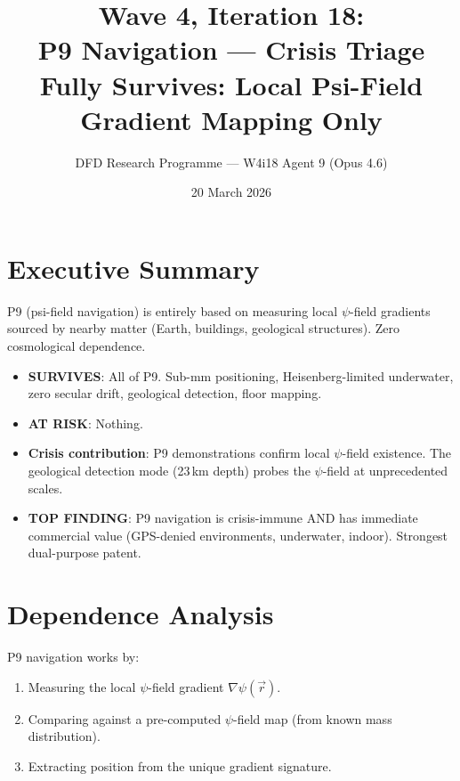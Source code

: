 \documentclass[11pt]{article}
\title{\textbf{Wave 4, Iteration 18:}\\
\textbf{P9 Navigation --- Crisis Triage}\\[6pt]
{\large Fully Survives: Local Psi-Field Gradient Mapping Only}}
\author{DFD Research Programme --- W4i18 Agent 9 (Opus 4.6)}
\date{20 March 2026}
\begin{document}
\maketitle

\section*{Executive Summary}

\begin{tcolorbox}[colback=green!5!white, colframe=green!70!black,
  title=\textbf{W4i18: P9 FULLY SURVIVES}]

P9 (psi-field navigation) is entirely based on measuring local
$\psi$-field gradients sourced by nearby matter (Earth, buildings,
geological structures). Zero cosmological dependence.

\begin{itemize}
\item \textbf{SURVIVES}: All of P9. Sub-mm positioning, Heisenberg-limited
  underwater, zero secular drift, geological detection, floor mapping.
\item \textbf{AT RISK}: Nothing.
\item \textbf{Crisis contribution}: P9 demonstrations confirm local
  $\psi$-field existence. The geological detection mode (23\,km depth)
  probes the $\psi$-field at unprecedented scales.
\item \textbf{TOP FINDING}: P9 navigation is crisis-immune AND has
  immediate commercial value (GPS-denied environments, underwater,
  indoor). Strongest dual-purpose patent.
\end{itemize}
\end{tcolorbox}

\section{Dependence Analysis}

P9 navigation works by:
\begin{enumerate}
\item Measuring the local $\psi$-field gradient $\nabla\psi(\vec{r})$.
\item Comparing against a pre-computed $\psi$-field map (from known
  mass distribution).
\item Extracting position from the unique gradient signature.
\end{enumerate}
\end{document}
